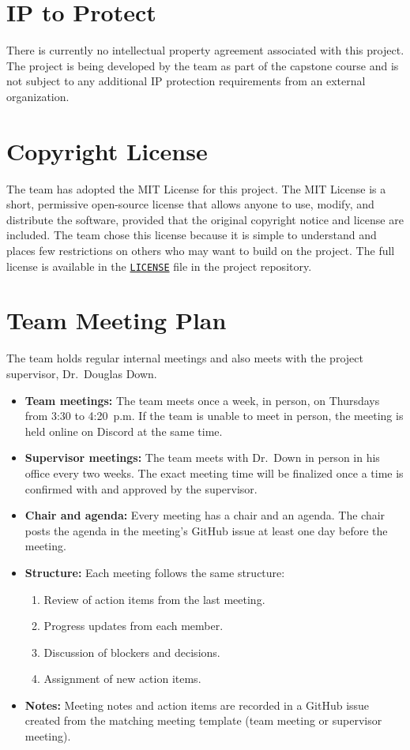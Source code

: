 \documentclass{article}
\begin{document}
\section{IP to Protect}

There is currently no intellectual property agreement associated with this
project. The project is being developed by the team as part of the capstone
course and is not subject to any additional IP protection requirements from an
external organization.

\section{Copyright License}

The team has adopted the MIT License for this project. The MIT License is a
short, permissive open-source license that allows anyone to use, modify, and
distribute the software, provided that the original copyright notice and
license are included. The team chose this license because it is simple to
understand and places few restrictions on others who may want to build on the
project. The full license is available in the
\href{https://github.com/SoftwareMandems/FPVR/blob/main/LICENSE}{\texttt{LICENSE}}
file in the project repository.

\section{Team Meeting Plan}

The team holds regular internal meetings and also meets with the project
supervisor, Dr.\ Douglas Down.

\begin{itemize}
  \item \textbf{Team meetings:} The team meets once a week, in person, on
  Thursdays from 3:30 to 4:20~p.m. If the team is unable to meet in person,
  the meeting is held online on Discord at the same time.
  \item \textbf{Supervisor meetings:} The team meets with Dr.\ Down in person
  in his office every two weeks. The exact meeting time will be finalized once
  a time is confirmed with and approved by the supervisor.
  \item \textbf{Chair and agenda:} Every meeting has a chair and an agenda. The
  chair posts the agenda in the meeting's GitHub issue at least one day before
  the meeting.
  \item \textbf{Structure:} Each meeting follows the same structure:
  \begin{enumerate}
    \item Review of action items from the last meeting.
    \item Progress updates from each member.
    \item Discussion of blockers and decisions.
    \item Assignment of new action items.
  \end{enumerate}
  \item \textbf{Notes:} Meeting notes and action items are recorded in a
  GitHub issue created from the matching meeting template (team meeting or
  supervisor meeting).
\end{itemize}
\end{document}
